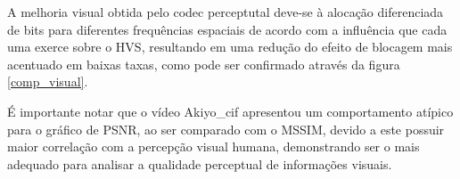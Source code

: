 A melhoria visual obtida pelo codec perceptutal deve-se à alocação diferenciada de bits para diferentes frequências espaciais de acordo com a influência que cada uma exerce sobre o HVS, resultando em uma redução do efeito de blocagem mais acentuado em baixas taxas, como pode ser confirmado através da figura \ref{comp_visual}.

É importante notar que o vídeo Akiyo\_cif apresentou um comportamento atípico para o gráfico de PSNR, ao ser comparado com o MSSIM, devido a este possuir maior correlação com a percepção visual humana, demonstrando ser o mais adequado para analisar a qualidade perceptual de informações visuais.

\begin{figure}[!ht]\label{MSSIN}

\end{figure}
